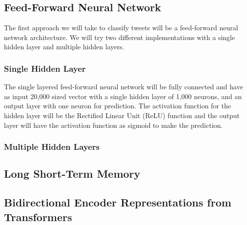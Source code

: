 \subsection{Feed-Forward Neural Network} The first approach we will
take to classify tweets will be a feed-forward neural network
architecture. We will try two different implementations with a single
hidden layer and multiple hidden layers.

\subsubsection{Single Hidden Layer} The single layered feed-forward
neural network will be fully connected and have as input 20,000 sized
vector with a single hidden layer of 1,000 neurons, and an output
layer with one neuron for prediction. The activation function for the
hidden layer will be the Rectified Linear Unit (ReLU) function and the
output layer will have the activation function as sigmoid to make the
prediction.

\subsubsection{Multiple Hidden Layers}

\subsection{Long Short-Term Memory}

\subsection{Bidirectional Encoder Representations from Transformers}

